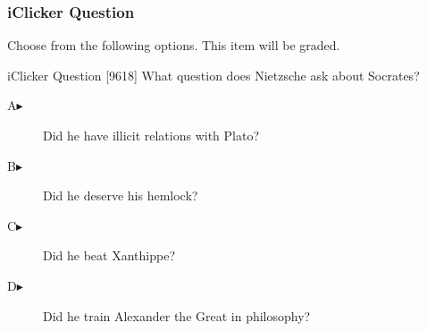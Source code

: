 \begin{frame}
  \frametitle{iClicker Question}
Choose from the following options. This item will be graded.
\begin{block}{iClicker Question}
[9618] What question does Nietzsche ask about Socrates?
\end{block}
\begin{description}
\item[A\hspace{.2in}$\blacktriangleright$] Did he have illicit relations with Plato?
\item[B\hspace{.2in}$\blacktriangleright$] Did he deserve his hemlock?
\item[C\hspace{.2in}$\blacktriangleright$] Did he beat Xanthippe?
\item[D\hspace{.2in}$\blacktriangleright$] Did he train Alexander the Great in philosophy?
\end{description}
\end{frame}
